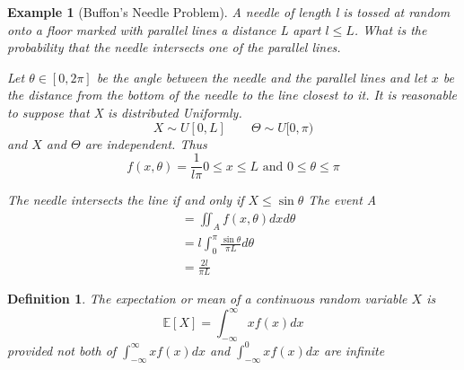 \documentclass{notes}
\theoremstyle{plain}
\newtheorem*{example}{Example}
\newtheorem{definition}{Definition}[chapter]
\newcommand{\bE}{\mathbb{E}}
\newcommand{\expect}[1]{\bE\!\left[#1\right]}
\begin{document}
\begin{example}[Buffon's Needle Problem]
A needle of length l is tossed at random onto a floor marked with
parallel lines a distance L apart $l \le L$. What is the probability
that the needle intersects one of the parallel lines.

\vspace{3in}

Let $ \theta \in[0,2\pi]$ be the angle between the needle and the
parallel lines and let $x$ be the distance from the bottom of the
needle  to the line closest to it.  It is reasonable to suppose that X
is distributed \emph{Uniformly}.
\[
X \sim U[0,L]\qquad \Theta \sim U[0,\pi)
\]
and $X$ and $\Theta$ are independent. Thus
\[
f(x,\theta) = \frac{1}{l\pi} 0\leq x \le L \text{ and } 0\leq \theta \le \pi
\] 

\vspace{3in}

The needle intersects the line if and only if $X \leq \sin \theta$
The event A
\begin{align*}
&=\iint_{A}f(x,\theta)dxd\theta\\
&=l\int_0^\pi\frac{\sin\theta}{\pi L} d\theta\\
&=\frac{2l}{\pi L}
\end{align*}
\end{example}
\begin{definition}
The \emph{expectation } or mean of a continuous random variable $X$ is
\[
\expect{X} = \int_{-\infty}^{\infty}xf(x)dx
\]
provided not both of $\int_{-\infty}^{\infty}xf(x)dx$ and 
$\int_{-\infty}^{0}xf(x)dx$ are infinite
\end{definition}
\end{document}
